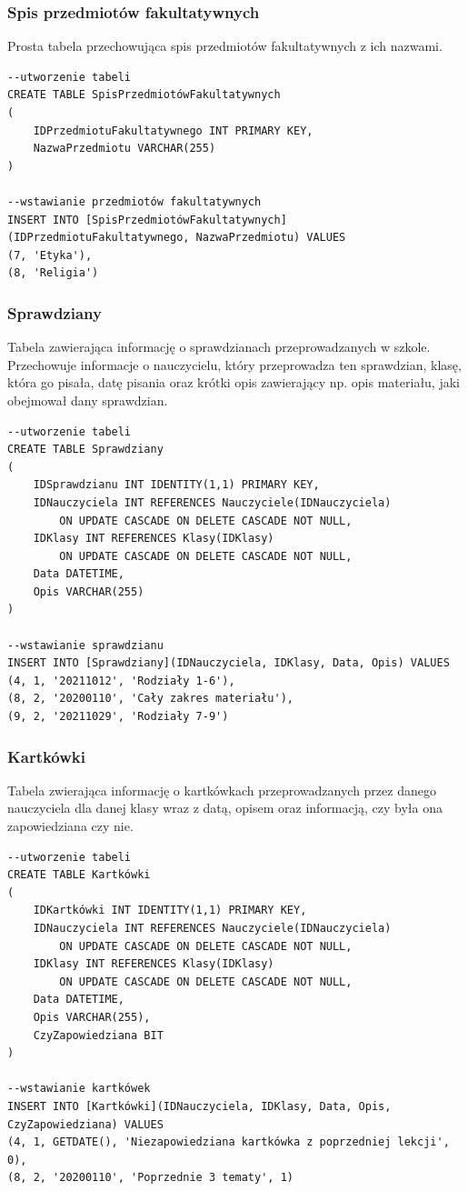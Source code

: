 \documentclass[60pt]{article}
\begin{document}
\subsubsection{Spis przedmiotów fakultatywnych}
Prosta tabela przechowująca spis przedmiotów fakultatywnych z ich nazwami.

 \begin{verbatim}
--utworzenie tabeli
CREATE TABLE SpisPrzedmiotówFakultatywnych
(
    IDPrzedmiotuFakultatywnego INT PRIMARY KEY,
    NazwaPrzedmiotu VARCHAR(255)
)

--wstawianie przedmiotów fakultatywnych
INSERT INTO [SpisPrzedmiotówFakultatywnych]
(IDPrzedmiotuFakultatywnego, NazwaPrzedmiotu) VALUES
(7, 'Etyka'),
(8, 'Religia')
\end{verbatim}

 \subsubsection{Sprawdziany}
Tabela zawierająca informację o sprawdzianach przeprowadzanych w szkole. Przechowuje informacje o nauczycielu, który przeprowadza ten sprawdzian, klasę, która go pisała, datę pisania oraz krótki opis zawierający np. opis materiału, jaki obejmował dany sprawdzian.
 
\begin{verbatim}
--utworzenie tabeli
CREATE TABLE Sprawdziany
(
    IDSprawdzianu INT IDENTITY(1,1) PRIMARY KEY,
    IDNauczyciela INT REFERENCES Nauczyciele(IDNauczyciela)
        ON UPDATE CASCADE ON DELETE CASCADE NOT NULL,
    IDKlasy INT REFERENCES Klasy(IDKlasy)
        ON UPDATE CASCADE ON DELETE CASCADE NOT NULL,
    Data DATETIME,
    Opis VARCHAR(255)
)

--wstawianie sprawdzianu
INSERT INTO [Sprawdziany](IDNauczyciela, IDKlasy, Data, Opis) VALUES
(4, 1, '20211012', 'Rodziały 1-6'),
(8, 2, '20200110', 'Cały zakres materiału'),
(9, 2, '20211029', 'Rodziały 7-9')
\end{verbatim}

 \subsubsection{Kartkówki}
Tabela zwierająca informację o kartkówkach przeprowadzanych przez danego nauczyciela dla danej klasy wraz z datą, opisem oraz informacją, czy była ona zapowiedziana czy nie.
 
\begin{verbatim}
--utworzenie tabeli
CREATE TABLE Kartkówki
(
    IDKartkówki INT IDENTITY(1,1) PRIMARY KEY,
    IDNauczyciela INT REFERENCES Nauczyciele(IDNauczyciela)
        ON UPDATE CASCADE ON DELETE CASCADE NOT NULL,
    IDKlasy INT REFERENCES Klasy(IDKlasy)
        ON UPDATE CASCADE ON DELETE CASCADE NOT NULL,
    Data DATETIME,
    Opis VARCHAR(255),
    CzyZapowiedziana BIT
)

--wstawianie kartkówek
INSERT INTO [Kartkówki](IDNauczyciela, IDKlasy, Data, Opis, CzyZapowiedziana) VALUES
(4, 1, GETDATE(), 'Niezapowiedziana kartkówka z poprzedniej lekcji', 0),
(8, 2, '20200110', 'Poprzednie 3 tematy', 1)
\end{verbatim}
\end{document}
